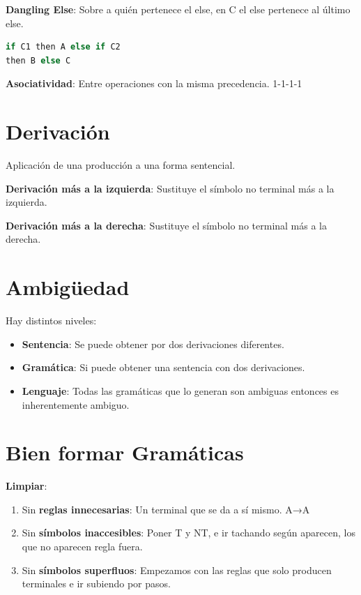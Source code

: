 \documentclass[12pt, twoside, openright]{report} %
\begin{document}
\textbf{Dangling Else}: Sobre a quién pertenece el else, en C el else
pertenece al último else.

\begin{lstlisting}[language=C]
if C1 then A else if C2
then B else C
\end{lstlisting}

\textbf{Asociatividad}: Entre operaciones con la misma precedencia.
1-1-1-1


\section{Derivación}

Aplicación de una producción a una forma sentencial.

\textbf{Derivación más a la izquierda}: Sustituye el símbolo no terminal
más a la izquierda.

\textbf{Derivación más a la derecha}: Sustituye el símbolo no terminal
más a la derecha.


\section{Ambigüedad}

Hay distintos niveles:

\begin{itemize}

\item
  \textbf{Sentencia}: Se puede obtener por dos derivaciones diferentes.
\item
  \textbf{Gramática}: Si puede obtener una sentencia con dos
  derivaciones.
\item
  \textbf{Lenguaje}: Todas las gramáticas que lo generan son ambiguas
  entonces es inherentemente ambiguo.
\end{itemize}


\section{Bien formar Gramáticas}

\textbf{Limpiar}:

\begin{enumerate}
\def\labelenumi{\arabic{enumi}.}
\item
  Sin \textbf{reglas innecesarias}: Un terminal que se da a sí mismo.
  A→A
\item
  Sin \textbf{símbolos inaccesibles}: Poner T y NT, e ir tachando según
  aparecen, los que no aparecen regla fuera.
\item
  Sin \textbf{símbolos superfluos}: Empezamos con las reglas que solo
  producen terminales e ir subiendo por pasos.
\end{enumerate}
\end{document}
